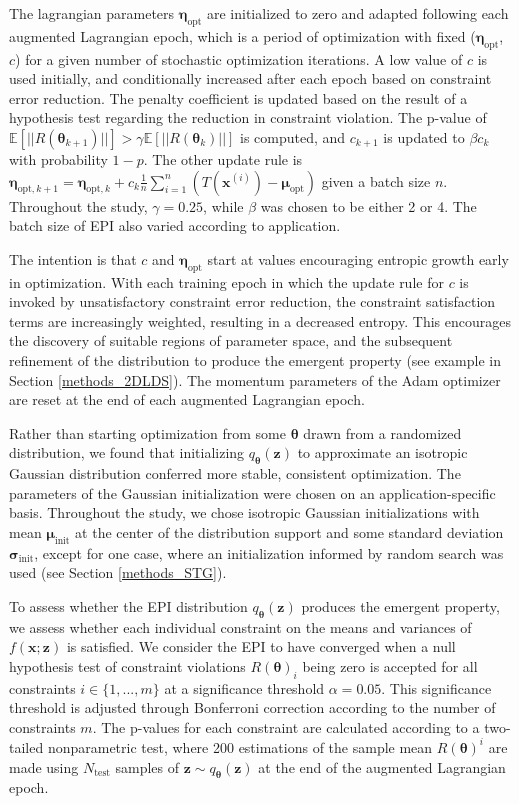 \documentclass[11pt]{article}
\begin{document}
The lagrangian parameters $\bm{\eta}_{\text{opt}}$ are initialized to zero and adapted following each augmented Lagrangian epoch, which is a period of optimization with fixed ($\bm{\eta}_{\text{opt}}$, $c$) for a given number of stochastic optimization iterations. 
A low value of $c$ is used initially, and conditionally increased after each epoch based on constraint error reduction.
The penalty coefficient is updated based on the result of a hypothesis test regarding the reduction in constraint violation.  
The p-value of $\mathbb{E}[||R(\bm{\theta}_{k+1})||] > \gamma \mathbb{E} \left[||R(\bm{\theta}_{k})|| \right]$ is computed, and $c_{k+1}$ is updated  to $\beta c_k$ with probability $1-p$.  
The other update rule is $\bm{\eta}_{\text{opt},k+1} = \bm{\eta}_{\text{opt},k} + c_k \frac{1}{n} \sum_{i=1}^n (T(\mathbf{x}^{(i)}) - \bm{\mu}_{\text{opt}})$ given a batch size $n$.
Throughout the study, $\gamma = 0.25$, while $\beta$ was chosen to be either 2 or 4.  The batch size of EPI also varied according to application.

The intention is that $c$ and $\bm{\eta}_{\text{opt}}$ start at values encouraging entropic growth early in optimization.  
With each training epoch in which the update rule for $c$ is invoked by unsatisfactory constraint error reduction, the constraint satisfaction terms are increasingly weighted, resulting in a decreased entropy.
This encourages the discovery of suitable regions of parameter space, and the subsequent refinement of the distribution to produce the emergent property (see example in Section \ref{methods_2DLDS}).
The momentum parameters of the Adam optimizer are reset at the end of each augmented Lagrangian epoch.

Rather than starting optimization from some $\bm{\theta}$ drawn from a randomized distribution, we found that initializing $q_{\bm{\theta}}(\mathbf{z})$ to approximate an isotropic Gaussian distribution conferred more stable, consistent optimization.  
The parameters of the Gaussian initialization were chosen on an application-specific basis.  
Throughout the study, we chose isotropic Gaussian initializations with mean $\bm{\mu}_{\text{init}}$ at the center of the distribution support and some standard deviation $\bm{\sigma}_{\text{init}}$, except for one case, where an initialization informed by random search was used (see Section \ref{methods_STG}).

To assess whether the EPI distribution $q_{\bm{\theta}}(\mathbf{z})$ produces the emergent property, we assess whether each individual constraint on the means and variances of $f(\mathbf{x}; \mathbf{z})$ is satisfied.
We consider the EPI to have converged when a null hypothesis test of constraint violations $R(\bm{\theta})_i$ being zero is accepted for all constraints $i \in \{1, ..., m\}$ at a significance threshold $\alpha=0.05$. 
This significance threshold is adjusted through Bonferroni correction according to the number of constraints $m$.  
The p-values for each constraint are calculated according to a two-tailed nonparametric test, where 200 estimations of the sample mean $R(\bm{\theta})^i$ are made using $N_{\text{test}}$ samples of $\mathbf{z} \sim q_{\bm{\theta}}(\mathbf{z})$ at the end of the augmented Lagrangian epoch.
\end{document}
